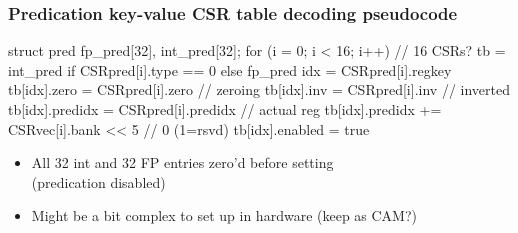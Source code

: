 \documentclass[slidestop]{beamer}
\begin{document}


\begin{frame}[fragile]
\frametitle{Predication key-value CSR table decoding pseudocode}

\begin{semiverbatim}
struct pred fp\_pred[32], int\_pred[32];
for (i = 0; i < 16; i++) // 16 CSRs?
   tb = int\_pred if CSRpred[i].type == 0 else fp\_pred
   idx = CSRpred[i].regkey
   tb[idx].zero     = CSRpred[i].zero    // zeroing
   tb[idx].inv      = CSRpred[i].inv     // inverted
   tb[idx].predidx  = CSRpred[i].predidx // actual reg
   tb[idx].predidx += CSRvec[i].bank << 5 // 0 (1=rsvd)
   tb[idx].enabled  = true
\end{semiverbatim}

 \begin{itemize}
   \item All 32 int and 32 FP entries zero'd before setting\\
	     (predication disabled)
   \item Might be a bit complex to set up in hardware (keep as CAM?)
  \end{itemize}

\end{frame}
\end{document}
